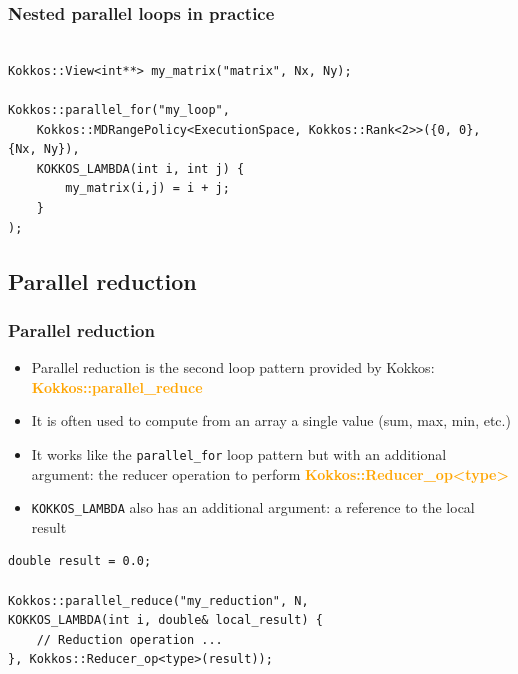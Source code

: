 \documentclass[aspectratio=169]{beamer}
\newcommand{\highlight}[1]{\textcolor{orange}{\textbf{#1}}}
\begin{document}

\begin{frame}[fragile]
    \frametitle{Nested parallel loops in practice}

\footnotesize
\begin{verbatim}

Kokkos::View<int**> my_matrix("matrix", Nx, Ny);

Kokkos::parallel_for("my_loop", 
    Kokkos::MDRangePolicy<ExecutionSpace, Kokkos::Rank<2>>({0, 0}, {Nx, Ny}),
    KOKKOS_LAMBDA(int i, int j) { 
        my_matrix(i,j) = i + j;
    }
);
\end{verbatim}
\end{frame}


\subsection[Parallel reduction]{Parallel reduction}


\begin{frame}[fragile]
    \frametitle{Parallel reduction}

\begin{itemize}
\item Parallel reduction is the second loop pattern provided by Kokkos: \highlight{Kokkos::parallel\_reduce}
\item It is often used to compute from an array a single value (sum, max, min, etc.)
\item It works like the \texttt{parallel\_for} loop pattern but with an additional argument: the reducer operation to perform \highlight{Kokkos::Reducer\_op<type>}
\item \texttt{KOKKOS\_LAMBDA} also has an additional argument: a reference to the local result
\end{itemize}

\footnotesize
\begin{verbatim}
double result = 0.0;

Kokkos::parallel_reduce("my_reduction", N,
KOKKOS_LAMBDA(int i, double& local_result) {
    // Reduction operation ...
}, Kokkos::Reducer_op<type>(result));
\end{verbatim}

\end{frame}
\end{document}
